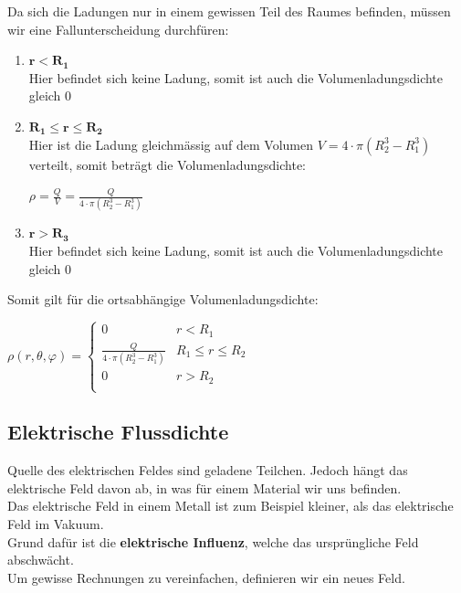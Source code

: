 \beginbsp
Da sich die Ladungen nur in einem gewissen Teil des Raumes befinden, müssen wir eine Fallunterscheidung durchfüren:
\begin{enumerate}
	\item $\mathbf{r < R_1}$ \\
	      Hier befindet sich keine Ladung, somit ist auch die Volumenladungsdichte gleich 0
	\item $\mathbf{R_1 \leq r \leq R_2}$ \\
	      Hier ist die Ladung gleichmässig auf dem Volumen $V = 4\cdot \pi (R_2^3 - R_1^3)$ verteilt, somit beträgt die Volumenladungsdichte:
	      \begin{center}
	      	$\displaystyle \rho = \frac{Q}{V} = \frac{Q}{4 \cdot \pi (R_2^3 - R_1^3) }$
	      \end{center}
	\item $\mathbf{r > R_3}$ \\
	      Hier befindet sich keine Ladung, somit ist auch die Volumenladungsdichte gleich 0
\end{enumerate}

Somit gilt für die ortsabhängige Volumenladungsdichte:
\begin{center}
	$\displaystyle	\rho(r,\theta,\varphi) =
	\begin{cases}
		0                                     & r < R_1             \\
		\frac{Q}{4 \cdot \pi (R_2^3 - R_1^3)} & R_1 \leq r \leq R_2 \\
		0                                     & r > R_2             \\
	\end{cases}$
\end{center}

\iend


\newpage

\subsection{Elektrische Flussdichte}
Quelle des elektrischen Feldes sind geladene Teilchen. Jedoch hängt das elektrische Feld davon ab, in was für einem Material wir uns befinden. \\
Das elektrische Feld in einem Metall ist zum Beispiel kleiner, als das elektrische Feld im Vakuum. \\
Grund dafür ist die \textbf{elektrische Influenz}, welche das ursprüngliche Feld abschwächt. \\
Um gewisse Rechnungen zu vereinfachen, definieren wir ein neues Feld.


